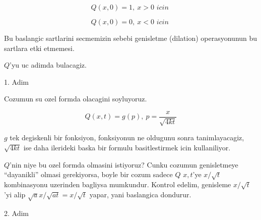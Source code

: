 \documentclass[12pt,fleqn]{article}
\begin{document}
\[ Q(x,0) = 1, \ x>0 \textit{ icin } \]

\[ Q(x,0)=0, \ x<0 \textit{ icin }  \]

Bu baslangic sartlarini secmemizin sebebi genisletme (dilation)
operasyonunun bu sartlara etki etmemesi. 

$Q$'yu uc adimda bulacagiz. 

1. Adim

Cozumun su ozel formda olacagini soyluyoruz. 

\[ Q(x,t) = g(p), \ p = \frac{x}{\sqrt{4kt}} \]

$g$ tek degiskenli bir fonksiyon, fonksiyonun ne oldugunu sonra
tanimlayacagiz, $\sqrt{4kt}$ ise daha ilerideki baska bir formulu
basitlestirmek icin kullaniliyor. 

$Q$'nin niye bu ozel formda olmasini istiyoruz? Cunku cozumun genisletmeye
``dayanikli'' olmasi gerekiyorsa, boyle bir cozum sadece $Q$ $x,t$'ye
$x/\sqrt{t}$ kombinasyonu uzerinden bagliysa mumkundur. Kontrol edelim,
genisleme $x/\sqrt{t}$'yi alip $\sqrt{a}x/\sqrt{at} = x/\sqrt{t}$ yapar,
yani baslangica dondurur. 

2. Adim
\end{document}
